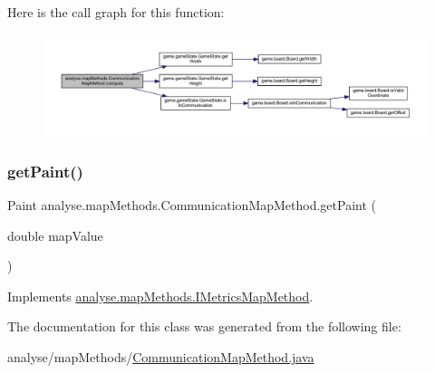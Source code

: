 Here is the call graph for this function\+:
\nopagebreak
\begin{figure}[H]
\begin{center}
\leavevmode
\includegraphics[width=350pt]{classanalyse_1_1map_methods_1_1_communication_map_method_a9e617c1890ad709390adc27497bfd6ea_cgraph}
\end{center}
\end{figure}
\mbox{\label{classanalyse_1_1map_methods_1_1_communication_map_method_ac51687c49fddaa463b261af6b17d9b65}} 
\subsubsection{\texorpdfstring{get\+Paint()}{getPaint()}}
{\footnotesize\ttfamily Paint analyse.\+map\+Methods.\+Communication\+Map\+Method.\+get\+Paint (\begin{DoxyParamCaption}\item[{double}]{map\+Value }\end{DoxyParamCaption})\hspace{0.3cm}{\ttfamily [inline]}}



Implements \mbox{\hyperlink{interfaceanalyse_1_1map_methods_1_1_i_metrics_map_method_a102909023c32cebe3bc75052f55b24a0}{analyse.\+map\+Methods.\+I\+Metrics\+Map\+Method}}.



The documentation for this class was generated from the following file\+:\begin{DoxyCompactItemize}
\item 
analyse/map\+Methods/\mbox{\hyperlink{_communication_map_method_8java}{Communication\+Map\+Method.\+java}}\end{DoxyCompactItemize}
